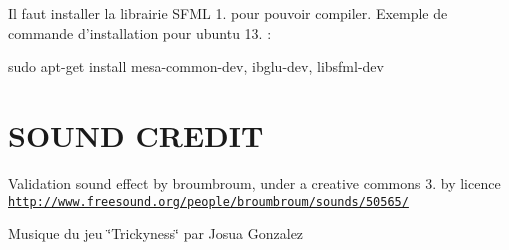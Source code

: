 Il faut installer la librairie S\-F\-M\-L 1. pour pouvoir compiler. Exemple de commande d'installation pour ubuntu 13. \-:

sudo apt-\/get install mesa-\/common-\/dev, ibglu-\/dev, libsfml-\/dev

\section*{S\-O\-U\-N\-D C\-R\-E\-D\-I\-T}

Validation sound effect by broumbroum, under a creative commons 3. by licence \href{http://www.freesound.org/people/broumbroum/sounds/50565/}{\tt http\-://www.\-freesound.\-org/people/broumbroum/sounds/50565/}

Musique du jeu \char`\"{}\-Trickyness\char`\"{} par Josua Gonzalez 